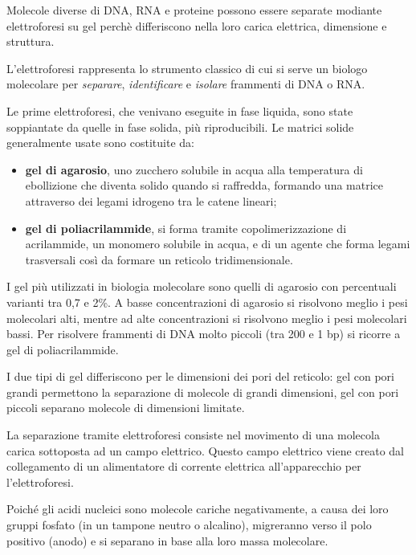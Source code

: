 \documentclass[]{article}
\begin{document}
Molecole diverse di DNA, RNA e proteine possono essere separate modiante
elettroforesi su gel perchè differiscono nella loro carica elettrica,
dimensione e struttura.

L'elettroforesi rappresenta lo strumento classico di cui si serve un
biologo molecolare per \emph{separare}, \emph{identificare} e
\emph{isolare} frammenti di DNA o RNA.

Le prime elettroforesi, che venivano eseguite in fase liquida, sono
state soppiantate da quelle in fase solida, più riproducibili. Le
matrici solide generalmente usate sono costituite da:

\begin{itemize}
\itemsep1pt\parskip0pt
\item
  \textbf{gel di agarosio}, uno zucchero solubile in acqua alla
  temperatura di ebollizione che diventa solido quando si raffredda,
  formando una matrice attraverso dei legami idrogeno tra le catene
  lineari;
\item
  \textbf{gel di poliacrilammide}, si forma tramite copolimerizzazione
  di acrilammide, un monomero solubile in acqua, e di un agente che
  forma legami trasversali così da formare un reticolo tridimensionale.
\end{itemize}

I gel più utilizzati in biologia molecolare sono quelli di agarosio con
percentuali varianti tra 0,7 e 2\%. A basse concentrazioni di agarosio
si risolvono meglio i pesi molecolari alti, mentre ad alte
concentrazioni si risolvono meglio i pesi molecolari bassi. Per
risolvere frammenti di DNA molto piccoli (tra 200 e 1 bp) si ricorre a
gel di poliacrilammide.

I due tipi di gel differiscono per le dimensioni dei pori del reticolo:
gel con pori grandi permettono la separazione di molecole di grandi
dimensioni, gel con pori piccoli separano molecole di dimensioni
limitate.

La separazione tramite elettroforesi consiste nel movimento di una
molecola carica sottoposta ad un campo elettrico. Questo campo elettrico
viene creato dal collegamento di un alimentatore di corrente elettrica
all'apparecchio per l'elettroforesi.

Poiché gli acidi nucleici sono molecole cariche negativamente, a causa
dei loro gruppi fosfato (in un tampone neutro o alcalino), migreranno
verso il polo positivo (anodo) e si separano in base alla loro massa
molecolare.
\end{document}
